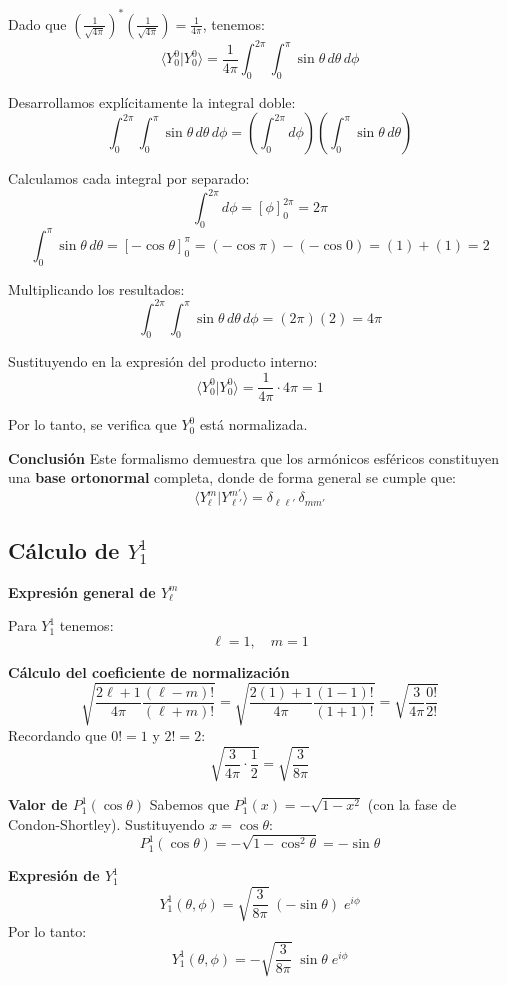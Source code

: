 \documentclass[a4paper]{article}
\begin{document}
Dado que $\left( \frac{1}{\sqrt{4\pi}} \right)^* \left( \frac{1}{\sqrt{4\pi}} \right) = \frac{1}{4\pi}$, tenemos:
$$
\langle Y_0^0 | Y_0^0 \rangle = \frac{1}{4\pi} \int_{0}^{2\pi} \int_{0}^{\pi} \sin \theta \, d\theta \, d\phi
$$

Desarrollamos explícitamente la integral doble:
$$
\int_{0}^{2\pi} \int_{0}^{\pi} \sin \theta \, d\theta \, d\phi = \left( \int_{0}^{2\pi} d\phi \right) \left( \int_{0}^{\pi} \sin \theta \, d\theta \right)
$$

Calculamos cada integral por separado:
$$
\int_{0}^{2\pi} d\phi = \left[ \phi \right]_{0}^{2\pi} = 2\pi
$$
$$
\int_{0}^{\pi} \sin \theta \, d\theta = \left[ -\cos \theta \right]_{0}^{\pi} = (-\cos \pi) - (-\cos 0) = (1) + (1) = 2
$$

Multiplicando los resultados:
$$
\int_{0}^{2\pi} \int_{0}^{\pi} \sin \theta \, d\theta \, d\phi = (2\pi)(2) = 4\pi
$$

Sustituyendo en la expresión del producto interno:
$$
\langle Y_0^0 | Y_0^0 \rangle = \frac{1}{4\pi} \cdot 4\pi = 1
$$

Por lo tanto, se verifica que $Y_0^0$ está normalizada.

\textbf{Conclusión}
Este formalismo demuestra que los armónicos esféricos constituyen una \textbf{base ortonormal} completa, donde de forma general se cumple que:
$$
\langle Y_\ell^m | Y_{\ell'}^{m'} \rangle = \delta_{\ell\ell'} \, \delta_{mm'}
$$

\subsection{Cálculo de $Y_1^1$}

\textbf{Expresión general de $Y_\ell^m$}

Para $Y_1^1$ tenemos:
$$
\ell = 1, \quad m = 1
$$

\textbf{Cálculo del coeficiente de normalización}
$$
\sqrt{\frac{2\ell+1}{4\pi} \frac{(\ell-m)!}{(\ell+m)!}} = \sqrt{\frac{2(1)+1}{4\pi} \frac{(1-1)!}{(1+1)!}} = \sqrt{\frac{3}{4\pi} \frac{0!}{2!}}
$$
Recordando que $0! = 1$ y $2! = 2$:
$$
\sqrt{\frac{3}{4\pi} \cdot \frac{1}{2}} = \sqrt{\frac{3}{8\pi}}
$$

\textbf{Valor de $P_1^1(\cos \theta)$}
Sabemos que $P_1^1(x) = -\sqrt{1 - x^2}$ (con la fase de Condon-Shortley). Sustituyendo $x = \cos \theta$:
$$
P_1^1(\cos \theta) = -\sqrt{1 - \cos^2 \theta} = -\sin \theta
$$

\textbf{Expresión de $Y_1^1$}
$$
Y_1^1(\theta, \phi) = \sqrt{\frac{3}{8\pi}} \; (-\sin \theta) \; e^{i \phi}
$$
Por lo tanto:
$$
Y_1^1(\theta, \phi) = -\sqrt{\frac{3}{8\pi}} \; \sin \theta \; e^{i \phi}
$$
\end{document}
